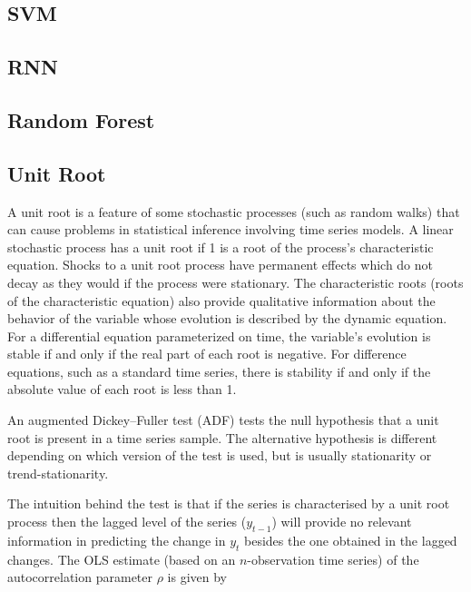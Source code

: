 \documentclass[
  11pt,
]{article}
\begin{document}
\hypertarget{svm}{%
\subsection{SVM}\label{svm}}

\hypertarget{rnn}{%
\subsection{RNN}\label{rnn}}

\hypertarget{random-forest}{%
\subsection{Random Forest}\label{random-forest}}

\hypertarget{unit-root}{%
\subsection{Unit Root}\label{unit-root}}

A unit root is a feature of some stochastic processes (such as random
walks) that can cause problems in statistical inference involving time
series models. A linear stochastic process has a unit root if 1 is a
root of the process's characteristic equation. Shocks to a unit root
process have permanent effects which do not decay as they would if the
process were stationary. The characteristic roots (roots of the
characteristic equation) also provide qualitative information about the
behavior of the variable whose evolution is described by the dynamic
equation. For a differential equation parameterized on time, the
variable's evolution is stable if and only if the real part of each root
is negative. For difference equations, such as a standard time series,
there is stability if and only if the absolute value of each root is
less than 1.

An augmented Dickey--Fuller test (ADF) tests the null hypothesis that a
unit root is present in a time series sample. The alternative hypothesis
is different depending on which version of the test is used, but is
usually stationarity or trend-stationarity.

The intuition behind the test is that if the series is characterised by
a unit root process then the lagged level of the series (\(y_{t-1}\))
will provide no relevant information in predicting the change in
\(y_{t}\) besides the one obtained in the lagged changes. The OLS
estimate (based on an \(n\)-observation time series) of the
autocorrelation parameter \(\rho\) is given by
\end{document}
